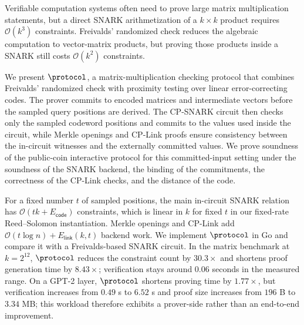 Verifiable computation systems often need to prove large matrix multiplication
statements, but a direct SNARK arithmetization of a \(k \times k\) product
requires \(\mathcal{O}(k^3)\) constraints. Freivalds' randomized check reduces
the algebraic computation to vector-matrix products, but proving those products
inside a SNARK still costs \(\mathcal{O}(k^2)\) constraints.

We present \(\protocol\), a matrix-multiplication checking protocol that combines
Freivalds' randomized check with proximity testing over linear error-correcting
codes. The prover commits to encoded matrices and intermediate vectors before
the sampled query positions are derived. The CP-SNARK circuit then checks only the sampled codeword positions and commits to the values used inside the circuit, while Merkle openings and CP-Link proofs ensure consistency between the in-circuit witnesses and the externally committed values. We prove soundness of the public-coin interactive protocol for this committed-input setting under the soundness of the SNARK backend, the binding of the commitments, the correctness of the CP-Link checks, and the distance of the code.

For a fixed number \(t\) of sampled positions, the main in-circuit SNARK
relation has \(\mathcal{O}(tk+E_{\mathsf{code}})\) constraints, which is linear
in \(k\) for fixed \(t\) in our fixed-rate Reed--Solomon instantiation.  Merkle
openings and CP-Link add
\(\mathcal{O}(t\log n)+E_{\mathsf{link}}(k,t)\) backend work. We implement
\(\protocol\) in Go and compare it with a Freivalds-based SNARK circuit. In the
matrix benchmark at \(k=2^{12}\), \(\protocol\) reduces the constraint count by
\(30.3\times\) and shortens proof generation time by \(8.43\times\); verification
stays around \(0.06\) seconds in the measured range.  On a GPT-2 layer,
\(\protocol\) shortens proving time by
\(1.77\times\), but verification increases from \(0.49\) s to \(6.52\) s and
proof size increases from \(196\) B to \(3.34\) MB; this workload therefore
exhibits a prover-side rather than an end-to-end improvement.
